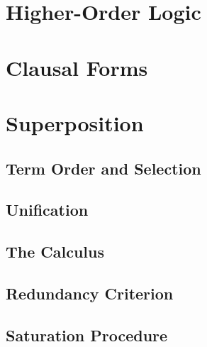 \section{Higher-Order Logic}
\section{Clausal Forms}
\section{Superposition}
\subsection{Term Order and Selection}
\subsection{Unification}
\subsection{The Calculus}
\subsection{Redundancy Criterion}
\subsection{Saturation Procedure}
